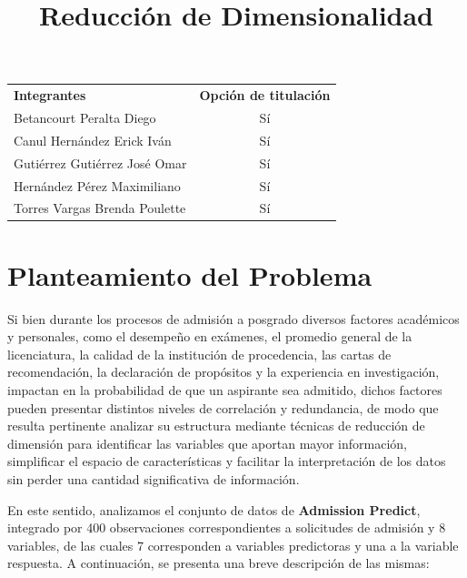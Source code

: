 \documentclass[
  10pt,
  a4paper]{article}
\begin{document}
\vspace{0.2cm}

\begin{table}[h]
    \centering
    \renewcommand{\arraystretch}{1.5} %
    \begin{tabular}{lc}
        \textbf{Integrantes} & \textbf{Opción de titulación}\\
        Betancourt Peralta Diego & Sí\\
        Canul Hernández Erick Iván & Sí\\
        Gutiérrez Gutiérrez José Omar & Sí\\
        Hernández Pérez Maximiliano & Sí\\
        Torres Vargas Brenda Poulette & Sí \\
    \end{tabular}
\end{table}

\thispagestyle{empty}

\clearpage

\tableofcontents

\clearpage

\title{Reducción de Dimensionalidad}

\section{Planteamiento del Problema}\label{planteamiento-del-problema}

Si bien durante los procesos de admisión a posgrado diversos factores académicos y personales, como el desempeño en exámenes, el promedio general de la licenciatura, la calidad de la institución de procedencia, las cartas de recomendación, la declaración de propósitos y la experiencia en investigación, impactan en la probabilidad de que un aspirante sea admitido, dichos factores pueden presentar distintos niveles de correlación y redundancia, de modo que resulta pertinente analizar su estructura mediante técnicas de reducción de dimensión para identificar las variables que aportan mayor información, simplificar el espacio de características y facilitar la interpretación de los datos sin perder una cantidad significativa de información.

En este sentido, analizamos el conjunto de datos de \textbf{Admission Predict}, integrado por 400 observaciones correspondientes a solicitudes de admisión y 8 variables, de las cuales 7 corresponden a variables predictoras y una a la variable respuesta. A continuación, se presenta una breve descripción de las mismas:
\end{document}
